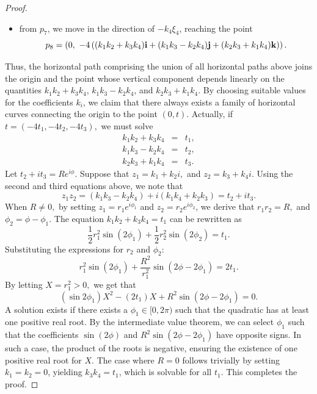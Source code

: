 \documentclass[10pt,a4paper]{amsart}
\newcommand{\bi}{{\bf i}}
\newcommand{\bj}{{\bf j}}
\newcommand{\bk}{{\bf k}}
\begin{document}
\begin{proof}
\begin{itemize}
from $p_6$ we proceed along $ -k_3 \xi_3 $, reaching  
$$
p_7 = \left(k_4 \bk,\ -4\left((k_1 k_2 + k_3 k_4) \bi + (k_1 k_3 - k_2 k_4) \bj + (k_2 k_3 + k_1 k_4) \bk\right) \right)
$$
and finally,
\item from $p_7$, we move in the direction of $ -k_4 \xi_4 $, reaching the point  
$$
p_8 = \left(0,\ -4\left((k_1 k_2 + k_3 k_4) \bi + (k_1 k_3 - k_2 k_4) \bj + (k_2 k_3 + k_1 k_4) \bk\right) \right).
$$
\end{itemize}
Thus, the horizontal path comprising the union of all horizontal paths above joins the origin and the point whose vertical component depends linearly on the quantities $k_1 k_2 + k_3 k_4 $, $ k_1 k_3 - k_2 k_4 $, and $ k_2 k_3 + k_1 k_4 $. By choosing suitable values 
for the coefficients $k_i$, we claim that there always exists a family of horizontal curves connecting the origin to the point $(0, t)$. Actually, if $t=(-4t_1, -4t_2, -4t_3),$ we must solve
\begin{eqnarray*}
k_1 k_2 + k_3 k_4&=&t_1,\\
k_1 k_3 - k_2 k_4&=&t_2,\\
k_2 k_3 + k_1 k_4 &=&t_3.
\end{eqnarray*}
Let $t_2 + i t_3 = R e^{i\phi}.$ Suppose that $z_1 =k_1 + k_2 i,$ and $z_2 = k_3 + k_4i$. Using the second and third equations above, we note that
$$z_1 z_2 = (k_1k_3 - k_2k_4) + i(k_1k_4 + k_2k_3) = t_2 + i t_3.$$
When $R\neq0,$ by setting $z_1 = r_1 e^{i\phi_1}$ and $z_2 = r_2 e^{i\phi_2}$, we derive that $r_1 r_2 = R,$ and $\phi_2 = \phi - \phi_1.$ 
The equation $k_1k_2 + k_3k_4 = t_1$ can be rewritten as 
$$\frac{1}{2} r_1^2 \sin(2\phi_1) + \frac{1}{2} r_2^2 \sin(2\phi_2) = t_1.$$
Substituting the expressions for $r_2$ and $\phi_2$:
$$r_1^2 \sin(2\phi_1) + \frac{R^2}{r_1^2} \sin(2\phi- 2\phi_1) = 2t_1.$$
By letting $X = r_1^2 > 0,$ we get that
$$(\sin 2\phi_1) X^2 - (2t_1) X + R^2 \sin(2\phi - 2\phi_1) = 0.$$
A solution exists if there exists a $\phi_1 \in [0, 2\pi)$ such that the quadratic has at least one positive real root. By the intermediate value theorem, we can select $\phi_1$ such that the coefficients $\sin(2\phi)$ and $R^2 \sin(2\phi - 2\phi_1)$ have opposite signs. In such a case, the product of the roots is negative, ensuring the existence of one positive real root for $X$.
The case where $R=0$ follows trivially by setting $k_1=k_2=0$, yielding $k_3k_4=t_1$, which is solvable for all $t_1$.
 This completes the proof.
\end{proof}
\end{document}
